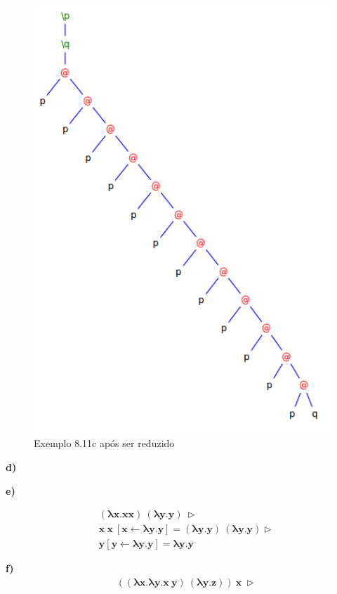 \documentclass[a4paper]{article}
\begin{document}
\begin{figure}[h]
  \centering
  \includegraphics[scale=0.5]{8-11c_2.png}
  \caption{Exemplo 8.11c após ser reduzido}
\end{figure}

\FloatBarrier

\textbf{d)}


\FloatBarrier
\textbf*{e)}

\begin{align*}
&\mathbf{(\lambda x.x x)\ (\lambda y.y)\ \rhd} \\
&\mathbf{x\ x\ [x \leftarrow \lambda y.y] = (\lambda y.y)\ (\lambda y.y) \rhd} \\
&\mathbf{y [y \leftarrow \lambda y.y] = \lambda y.y}
\end{align*}

\textbf{f)}
\begin{align*}
&\mathbf{((\lambda x.\lambda y.x\ y)\ (\lambda y.z))\ x\ \rhd} \\
\end{align*}
\end{document}
